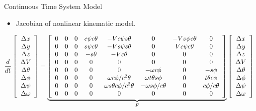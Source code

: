 \documentclass[hyperref={pdfpagelabels=false}]{beamer}
\begin{document}
\begin{frame}{Continuous Time System Model}
\begin{itemize}
\item Jacobian of nonlinear kinematic model.
\end{itemize}
{\tiny
\begin{align*}
\frac{d}{dt}\left[\begin{array}{c}
\Delta x \\ \Delta y \\ \Delta z \\ \Delta V \\ \Delta \theta \\ \Delta \phi \\ \Delta \psi \\ \Delta \omega
\end{array}\right] =
\underbrace{\left[\begin{array}{c c c c c c c c}
0 & 0 & 0 & c\psi c\theta & -V c\psi s\theta               & 0                     & -V s\psi c\theta & 0 \\
0 & 0 & 0 & s\psi c\theta & -V s\psi s\theta               & 0                     & V c\psi c\theta  & 0 \\
0 & 0 & 0 & -s\theta      & -V c\theta                     & 0                     & 0                & 0 \\
0 & 0 & 0 & 0             & 0                              & 0                     & 0                & 0 \\
0 & 0 & 0 & 0             & 0                              & -\omega c\phi         & 0                & -s\phi \\
0 & 0 & 0 & 0             & \omega c\phi/c^2\theta         & \omega t\theta s\phi  & 0                & t\theta c\phi \\
0 & 0 & 0 & 0             & \omega s\theta c\phi/c^2\theta & -\omega s\phi/c\theta & 0                & c\phi/c\theta \\
0 & 0 & 0 & 0             & 0                              & 0                     & 0                & 0
\end{array}\right]}_{F}
\left[\begin{array}{c}
\Delta x \\ \Delta y \\ \Delta z \\ \Delta V \\ \Delta \theta \\ \Delta \phi \\ \Delta \psi \\ \Delta \omega
\end{array}\right]
\end{align*}
}
\end{frame}
\end{document}
